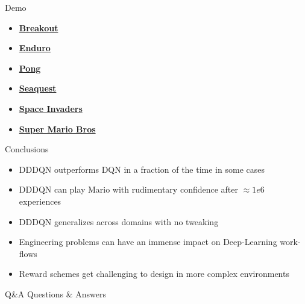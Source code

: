 \documentclass{beamer}
\begin{document}
\begin{frame}{Demo}
\begin{itemize}
\item{\href{https://youtu.be/6zf201DJrw0}{\textbf{Breakout}}}
\item{\href{https://youtu.be/6gAyvNIR-nk}{\textbf{Enduro}}}
\item{\href{https://youtu.be/MbYwTWhgMuE}{\textbf{Pong}}}
\item{\href{https://youtu.be/x12iHhEAOdg}{\textbf{Seaquest}}}
\item{\href{https://youtu.be/Zm6RGYQlTsU}{\textbf{Space Invaders}}}
\item{\href{https://youtu.be/H1Vmr5pm9B0}{\textbf{Super Mario Bros}}}
\end{itemize}
\end{frame}

\begin{frame}{Conclusions}
\begin{itemize}
    \item{DDDQN outperforms DQN in a fraction of the time in some cases}
    \item{DDDQN can play Mario with rudimentary confidence after $\approx 1e6$ experiences}
    \item{DDDQN generalizes across domains with no tweaking}
    \item{Engineering problems can have an immense impact on Deep-Learning work-flows}
    \item{Reward schemes get challenging to design in more complex environments}
\end{itemize}
\end{frame}

\begin{frame}{Q\&A}
\centering
Questions \& Answers
\end{frame}
\end{document}
